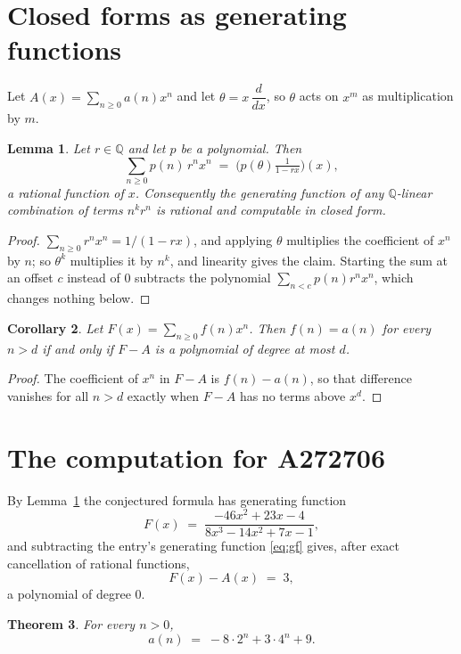 \documentclass[11pt,a4paper]{article}
\theoremstyle{plain}
\newtheorem{theorem}{Theorem}
\newtheorem{lemma}[theorem]{Lemma}
\newtheorem{corollary}[theorem]{Corollary}
\theoremstyle{definition}
\begin{document}
\section{Closed forms as generating functions}

Let $A(x)=\sum_{n\ge 0}a(n)x^{n}$ and let $\theta=x\,\dfrac{d}{dx}$, so $\theta$
acts on $x^{m}$ as multiplication by $m$.

\begin{lemma}\label{lem:gf}
Let $r\in\mathbb{Q}$ and let $p$ be a polynomial. Then
\[
\sum_{n\ge0}p(n)\,r^{n}x^{n}\;=\;\bigl(p(\theta)\tfrac{1}{1-rx}\bigr)(x),
\]
a rational function of $x$. Consequently the generating function of any
$\mathbb{Q}$-linear combination of terms $n^{k}r^{n}$ is rational and computable in
closed form.
\end{lemma}

\begin{proof}
$\sum_{n\ge0}r^{n}x^{n}=1/(1-rx)$, and applying $\theta$ multiplies the coefficient of
$x^{n}$ by $n$; so $\theta^{k}$ multiplies it by $n^{k}$, and linearity gives the claim.
Starting the sum at an offset $c$ instead of $0$ subtracts the polynomial
$\sum_{n<c}p(n)r^{n}x^{n}$, which changes nothing below.
\end{proof}

\begin{corollary}\label{cor:criterion}
Let $F(x)=\sum_{n\ge 0}f(n)x^{n}$. Then $f(n)=a(n)$ for every $n>d$ if and only
if $F-A$ is a polynomial of degree at most $d$.
\end{corollary}

\begin{proof}
The coefficient of $x^{n}$ in $F-A$ is $f(n)-a(n)$, so that difference vanishes for all
$n>d$ exactly when $F-A$ has no terms above $x^{d}$.
\end{proof}

\section{The computation for A272706}

By Lemma~\ref{lem:gf} the conjectured formula has generating function
\[
F(x)\;=\;\frac{- 46 x^{2} + 23 x - 4}{8 x^{3} - 14 x^{2} + 7 x - 1} ,
\]
and subtracting the entry's generating function \eqref{eq:gf} gives, after exact
cancellation of rational functions,
\[
F(x)-A(x)\;=\;3 ,
\]
a polynomial of degree $0$.

\begin{theorem}
For every $n>0$,
\[
a(n)\;=\;- 8 \cdot 2^{n} + 3 \cdot 4^{n} + 9 .
\]
\end{theorem}
\end{document}
